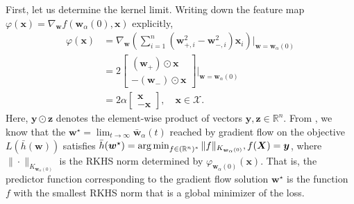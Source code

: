 \documentclass{article}
\DeclareMathOperator*{\argmin}{arg\,min}
\begin{document}
First, let us determine the kernel limit. Writing down the feature map $\varphi(\boldsymbol{x}) = \nabla_{\boldsymbol{w}} f(\boldsymbol{w}_{\alpha}(0), \boldsymbol{x})$ explicitly, 
\begin{align*}
    \varphi(\boldsymbol{x}) &= \nabla_{\boldsymbol{w}}\left( \sum_{i=1}^n(\boldsymbol{w}_{+, i}^2 - \boldsymbol{w}_{-, i}^2)\boldsymbol{x}_i \right)\bigg|_{\boldsymbol{w} = \boldsymbol{w}_{\alpha}(0)}\\
    &= 
    2\begin{bmatrix}
        (\boldsymbol{w}_+) \odot \boldsymbol{x}\\
        -(\boldsymbol{w}_-) \odot \boldsymbol{x}
    \end{bmatrix} \bigg|_{\boldsymbol{w} = \boldsymbol{w}_{\alpha}(0)}\\
    &= 2\alpha \begin{bmatrix}
        \boldsymbol{x}\\
        -\boldsymbol{x}
    \end{bmatrix}, \quad \boldsymbol{x} \in \mathcal{X}.
\end{align*}
Here, $\boldsymbol{y} \odot \boldsymbol{z}$ denotes the element-wise product of vectors $\boldsymbol{y}, \boldsymbol{z} \in \mathbb{R}^n$. From \cite{woodworth2020kernel}, we know that the $\boldsymbol{w}^{\star} = \lim_{t \to \infty} \boldsymbol{\bar{w}}_{\alpha}(t)$ reached by gradient flow on the objective $L(\bar{h}(\boldsymbol{w}))$ satisfies $\bar{h}(\boldsymbol{w}^{\star}) = \argmin_{f \in (\mathbb{R}^n)^*} \| f \|_{K_{\boldsymbol{w}_{\alpha}(0)}}, \\ f(\boldsymbol{X}) = \boldsymbol{y}$, where $\| \cdot \|_{K_{\boldsymbol{w}_{\alpha}(0)}}$ is the RKHS norm determined by $\varphi_{\boldsymbol{w}_{\alpha}(0)}(\boldsymbol{x})$. That is, the predictor function corresponding to the gradient flow solution $\boldsymbol{w}^{\star}$ is the function $f$ with the smallest  RKHS norm that is a global minimizer of the loss. 
\end{document}
